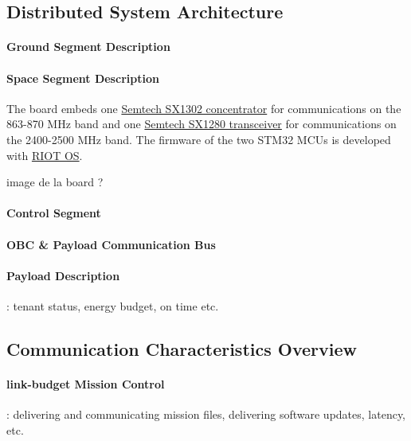 \subsection{Distributed System Architecture}
\paragraph*{Ground Segment Description}
\paragraph*{Space Segment Description}



The board embeds one \href{https://www.semtech.com/products/wireless-rf/lora-gateways/sx1302}{Semtech SX1302 concentrator} for communications on the 863-870 MHz 
band and one \href{https://www.semtech.com/products/wireless-rf/24-ghz-transceivers/sx1280}{Semtech SX1280 transceiver} for communications on the 2400-2500 MHz band. 
The firmware of the two STM32 MCUs is developed with \href{https://github.com/RIOT-OS/RIOT}{RIOT OS}.

image de la board ?

\paragraph*{Control Segment} %
\paragraph*{OBC \& Payload Communication Bus}
\paragraph*{Payload Description}: tenant status, energy budget, on time etc.

\subsection{Communication Characteristics Overview}
\paragraph*{link-budget Mission Control}: delivering and communicating mission
files, delivering software updates, latency, etc.

